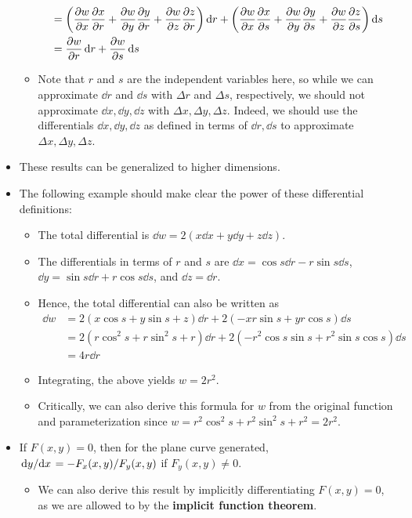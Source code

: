 \documentclass[../main.tex]{subfiles}
\begin{document}
\begin{itemize}
\begin{itemize}
\begin{align*}
            &= \left( \pdv{w}{x}\pdv{x}{r}+\pdv{w}{y}\pdv{y}{r}+\pdv{w}{z}\pdv{z}{r} \right)\dd{r}+\left( \pdv{w}{x}\pdv{x}{s}+\pdv{w}{y}\pdv{y}{s}+\pdv{w}{z}\pdv{z}{s} \right)\dd{s}\\
            &= \pdv{w}{r}\dd{r}+\pdv{w}{s}\dd{s}
        \end{align*}
        \item Note that $r$ and $s$ are the independent variables here, so while we can approximate $\dd{r}$ and $\dd{s}$ with $\Delta r$ and $\Delta s$, respectively, we should not approximate $\dd{x},\dd{y},\dd{z}$ with $\Delta x,\Delta y,\Delta z$. Indeed, we should use the differentials $\dd{x},\dd{y},\dd{z}$ as defined in terms of $\dd{r},\dd{s}$ to approximate $\Delta x,\Delta y,\Delta z$.
    \end{itemize}
    \item These results can be generalized to higher dimensions.
    \item The following example should make clear the power of these differential definitions: 
    \begin{itemize}
        \item The total differential is $\dd{w}=2(x\dd{x}+y\dd{y}+z\dd{z})$.
        \item The differentials in terms of $r$ and $s$ are $\dd{x}=\cos s\dd{r}-r\sin s\dd{s}$, $\dd{y}=\sin s\dd{r}+r\cos s\dd{s}$, and $\dd{z}=\dd{r}$.
        \item Hence, the total differential can also be written as
        \begin{align*}
            \dd{w} &= 2(x\cos s+y\sin s+z)\dd{r}+2(-xr\sin s+yr\cos s)\dd{s}\\
            &= 2(r\cos^2s+r\sin^2s+r)\dd{r}+2(-r^2\cos s\sin s+r^2\sin s\cos s)\dd{s}\\
            &= 4r\dd{r}
        \end{align*}
        \item Integrating, the above yields $w=2r^2$.
        \item Critically, we can also derive this formula for $w$ from the original function and parameterization since $w=r^2\cos^2s+r^2\sin^2s+r^2=2r^2$.
    \end{itemize}
    \item If $F(x,y)=0$, then for the plane curve generated, $\dv*{y}{x}=-F_x(x,y)/F_y(x,y)$ if $F_y(x,y)\neq 0$.
    \begin{itemize}
        \item We can also derive this result by implicitly differentiating $F(x,y)=0$, as we are allowed to by the \textbf{implicit function theorem}.
    \end{itemize}
\end{itemize}
\end{document}
